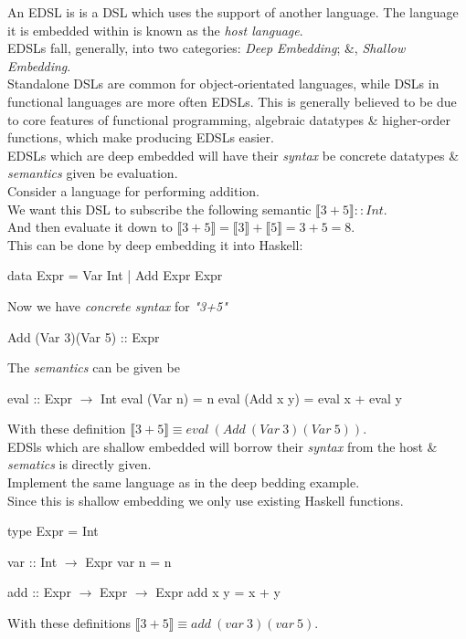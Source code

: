 \documentclass[11pt,a4paper]{article}
\begin{document}
An EDSL is is a DSL which uses the support of another language. The language it is embedded within is known as the \textit{host language}.\\
EDSLs fall, generally, into two categories: \textit{Deep Embedding}; \&, \textit{Shallow Embedding}.\\

Standalone DSLs are common for object-orientated languages, while DSLs in functional languages are more often EDSLs. This is generally believed to be due to core features of functional programming, algebraic datatypes \& higher-order functions, which make producing EDSLs easier.\\

EDSLs which are deep embedded will have their \textit{syntax} be concrete datatypes \& \textit{semantics} given be evaluation.\\

Consider a language for performing addition.\\
We want this DSL to subscribe the following semantic $\llbracket 3+5 \rrbracket :: Int$.\\
And then evaluate it down to $\llbracket 3+5 \rrbracket = \llbracket 3 \rrbracket + \llbracket 5 \rrbracket = 3 + 5 = 8$.\\
This can be done by deep embedding it into Haskell:
\begin{code}
data Expr = Var Int
          | Add Expr Expr
\end{code}
Now we have \textit{concrete syntax} for \textit{"3+5"}
\begin{code}
Add (Var 3)(Var 5) :: Expr
\end{code}
The \textit{semantics} can be given be
\begin{code}
eval :: Expr $\to$ Int
eval (Var n) = n
eval (Add x y) = eval x + eval y
\end{code}
With these definition $\llbracket 3+5 \rrbracket \equiv eval\ (Add\ (Var\ 3) (Var\ 5))$.\\


EDSls which are shallow embedded will borrow their \textit{syntax} from the host \& \textit{sematics} is directly given.\\

Implement the same language as in the deep bedding example.\\
Since this is shallow embedding we only use existing Haskell functions.
\begin{code}
  type Expr = Int

  var :: Int $\to$ Expr
  var n = n

  add :: Expr $\to$ Expr $\to$ Expr
  add x y = x + y
\end{code}
With these definitions $\llbracket 3+5 \rrbracket \equiv add\ (var\ 3) (var\ 5)$.\\
\end{document}
